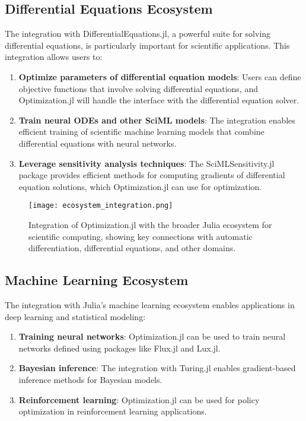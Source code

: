 \subsection{Differential Equations Ecosystem}

The integration with DifferentialEquations.jl, a powerful suite for solving differential equations, is particularly important for scientific applications. This integration allows users to:

\begin{enumerate}
\item \textbf{Optimize parameters of differential equation models}: Users can define objective functions that involve solving differential equations, and Optimization.jl will handle the interface with the differential equation solver.

\item \textbf{Train neural ODEs and other SciML models}: The integration enables efficient training of scientific machine learning models that combine differential equations with neural networks.

\item \textbf{Leverage sensitivity analysis techniques}: The SciMLSensitivity.jl package provides efficient methods for computing gradients of differential equation solutions, which Optimization.jl can use for optimization.
\end{enumerate}

\begin{figure}
\centering
\texttt{[image: ecosystem\_integration.png]}
\caption{Integration of Optimization.jl with the broader Julia ecosystem for scientific computing, showing key connections with automatic differentiation, differential equations, and other domains.}
\label{fig:ecosystem}
\end{figure}

\subsection{Machine Learning Ecosystem}

The integration with Julia's machine learning ecosystem enables applications in deep learning and statistical modeling:

\begin{enumerate}
\item \textbf{Training neural networks}: Optimization.jl can be used to train neural networks defined using packages like Flux.jl and Lux.jl.

\item \textbf{Bayesian inference}: The integration with Turing.jl enables gradient-based inference methods for Bayesian models.

\item \textbf{Reinforcement learning}: Optimization.jl can be used for policy optimization in reinforcement learning applications.
\end{enumerate}

